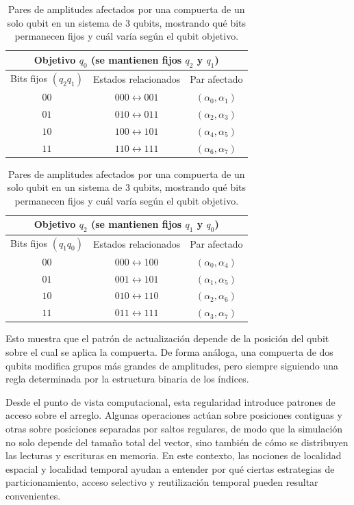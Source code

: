 \begin{table}[H]
    \centering
    \caption{Pares de amplitudes afectados por una compuerta de un solo qubit en un sistema de 3 qubits, mostrando qué bits permanecen fijos y cuál varía según el qubit objetivo.}
    \label{tab:pares-bits-compuerta}
    \footnotesize
    \begin{tabular}{c c c}
        \hline
        \multicolumn{3}{c}{Objetivo $q_0$ (se mantienen fijos $q_2$ y $q_1$)} \\
        \hline
        Bits fijos $(q_2 q_1)$ & Estados relacionados & Par afectado \\
        \hline
        $00$ & $000 \leftrightarrow 001$ & $(\alpha_0,\alpha_1)$ \\
        $01$ & $010 \leftrightarrow 011$ & $(\alpha_2,\alpha_3)$ \\
        $10$ & $100 \leftrightarrow 101$ & $(\alpha_4,\alpha_5)$ \\
        $11$ & $110 \leftrightarrow 111$ & $(\alpha_6,\alpha_7)$ \\
        \hline
    \end{tabular}

    \vspace{0.7em}

    \begin{tabular}{c c c}
        \hline
        \multicolumn{3}{c}{Objetivo $q_2$ (se mantienen fijos $q_1$ y $q_0$)} \\
        \hline
        Bits fijos $(q_1 q_0)$ & Estados relacionados & Par afectado \\
        \hline
        $00$ & $000 \leftrightarrow 100$ & $(\alpha_0,\alpha_4)$ \\
        $01$ & $001 \leftrightarrow 101$ & $(\alpha_1,\alpha_5)$ \\
        $10$ & $010 \leftrightarrow 110$ & $(\alpha_2,\alpha_6)$ \\
        $11$ & $011 \leftrightarrow 111$ & $(\alpha_3,\alpha_7)$ \\
        \hline
    \end{tabular}
\end{table}

Esto muestra que el patrón de actualización depende de la posición del qubit sobre el cual se aplica la compuerta. De forma análoga, una compuerta de dos qubits modifica grupos más grandes de amplitudes, pero siempre siguiendo una regla determinada por la estructura binaria de los índices.

Desde el punto de vista computacional, esta regularidad introduce patrones de acceso sobre el arreglo. Algunas operaciones actúan sobre posiciones contiguas y otras sobre posiciones separadas por saltos regulares, de modo que la simulación no solo depende del tamaño total del vector, sino también de cómo se distribuyen las lecturas y escrituras en memoria. En este contexto, las nociones de localidad espacial y localidad temporal ayudan a entender por qué ciertas estrategias de particionamiento, acceso selectivo y reutilización temporal pueden resultar convenientes.

